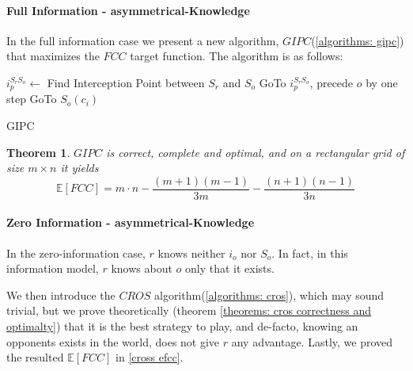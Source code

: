 \documentclass[a4paper,english,10pt]{article}
\newtheorem{theorem}{Theorem}[section]
\newcommand\rob{\ensuremath{r}\xspace}
\newcommand\opp{\ensuremath{o}\xspace}
\newcommand{\fcc}{\ensuremath{FCC}\xspace}
\newcommand{\gipc}{\ensuremath{GIPC}\xspace}
\newcommand{\cros}{\ensuremath{CROS}\xspace}
\begin{document}
\paragraph{Full Information - asymmetrical-Knowledge}

In the full information case we present a new algorithm, \gipc (\ref{algorithms: gipc}) that maximizes the \fcc target function.
The algorithm is as follows:
\begin{algorithm}
\begin{algorithmic}
	\STATE $i_p^{S_\rob S_\opp} \leftarrow $ Find Interception Point between $S_\rob$ and $S_\opp$
    \STATE GoTo $i_p^{S_\rob S_\opp}$, precede \opp by one step
    \LOOP
        	\STATE GoTo $S_\opp(c_i)$
        \ENDIF
    \ENDLOOP
  
\end{algorithmic}
\caption{GIPC\label{algorithms: gipc}}
\end{algorithm}

\begin{theorem}
\gipc is correct, complete and optimal, and on a rectangular grid of size $m\times n$ it yields \[\mathbb{E}[\fcc] = m\cdot n-\frac{\left(m+1\right)\left(m-1\right)}{3m}-\frac{\left(n+1\right)\left(n-1\right)}{3n}\]
\end{theorem}


\paragraph{Zero Information - asymmetrical-Knowledge}
In the zero-information case, \rob knows neither $i_\opp$ nor $S_\opp$. In fact, in this information model, \rob knows about \opp only that it exists.

We then introduce the \cros algorithm(\ref{algorithms: cros}), which may sound trivial, but we prove theoretically (theorem \ref{theorems: cros correctness and optimalty}) that it is the best strategy to play, and de-facto, knowing an opponents exists in the world, does not give \rob any advantage. Lastly, we proved the resulted $\mathbb{E}[\fcc]$ in \ref{cross efcc}.
\end{document}
